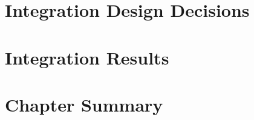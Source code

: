 

\section{Integration Design Decisions}






\section{Integration Results}


\section{Chapter Summary}

